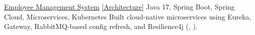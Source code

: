 \cvprojectsingle
{\href{https://github.com/UchihaIthachi/EMS}{Employee Management System} {\scriptsize\href{https://UchihaIthachi.github.io/cv/arch/ems.png}{[Architecture]}}}
{Java 17, Spring Boot, Spring Cloud, Microservices, Kubernetes}
{Built cloud-native microservices using Eureka, Gateway, RabbitMQ-based config refresh, and Resilience4j (, ).}